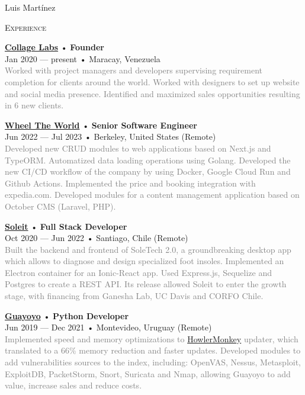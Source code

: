 \documentclass[12pt]{article}
\begin{document}
\begin{cv}{Luis Mart\'inez}
\begin{minipage}[t]{0.55\textwidth}
    \textrm{\textsc{\Large{Experience}}}
    \newline
    \parbox[t]{\linewidth}{
      \textbf{\href{https://collagelabs.org}{Collage Labs}} • \textrm{\textbf{Founder}}\\
      Jan 2020 --- present • Maracay, Venezuela\\
      \footnotesize{\textcolor{gray}{Worked with project managers and developers supervising requirement completion for clients around the world. Worked with designers to set up website and social media presence. Identified and maximized sales opportunities resulting in 6 new clients.}}\\
    }\vspace{0.125em}
    \parbox[t]{\linewidth}{
      \textbf{\href{https://wheeltheworld.com}{Wheel The World}} • \textrm{\textbf{Senior Software Engineer}}\\
      Jun 2022 --- Jul 2023 • Berkeley, United States (Remote)\\
      \footnotesize{\textcolor{gray}{Developed new CRUD modules to web applications based on Next.js and TypeORM. Automatized data loading operations using Golang. Developed the new CI/CD workflow of the company by using Docker, Google Cloud Run and Github Actions. Implemented the price and booking integration with expedia.com. Developed modules for a content management application based on October CMS (Laravel, PHP).}}\\
    }\vspace{0.125em}
    \parbox[t]{\linewidth}{
      \textbf{\href{https://soleit.app}{Soleit}} • \textrm{\textbf{Full Stack Developer}}\\
      Oct 2020 --- Jun 2022 • Santiago, Chile (Remote)\\
      \footnotesize{\textcolor{gray}{Built the backend and frontend of SoleTech 2.0, a groundbreaking desktop app which allows to diagnose and design specialized foot insoles. Implemented an Electron container for an Ionic-React app. Used Express.js, Sequelize and Postgres to create a REST API. Its release allowed Soleit to enter the growth stage, with financing from Ganesha Lab, UC Davis and CORFO Chile.}}\\
    }\vspace{0.125em}
    \parbox[t]{\linewidth}{
      \textbf{\href{https://guayoyo.io}{Guayoyo}} • \textrm{\textbf{Python Developer}}\\
      Jun 2019 --- Dec 2021 • Montevideo, Uruguay (Remote)\\
      \footnotesize{\textcolor{gray}{Implemented speed and memory optimizations to \href{https://howlermonkey.io}{HowlerMonkey} updater, which translated to a 66\% memory reduction and faster updates. Developed modules to add vulnerabilities sources to the index, including: OpenVAS, Nessus, Metasploit, ExploitDB, PacketStorm, Snort, Suricata and Nmap, allowing Guayoyo to add value, increase sales and reduce costs.}}\\
}
\end{minipage}
\end{cv}
\end{document}
